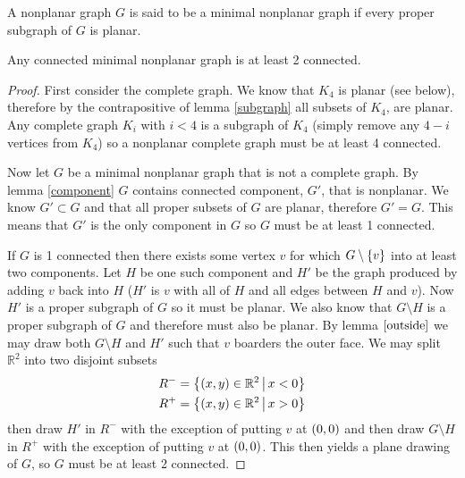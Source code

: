\documentclass{article}
\begin{document}
\begin{definition}
	A nonplanar graph $G$ is said to be a minimal nonplanar graph if every proper subgraph of $G$ is planar.
\end{definition}


\begin{lemma}\label{2connect}
	Any connected minimal nonplanar graph is at least 2 connected.
\end{lemma}

\begin{proof}
	First consider the complete graph. We know that $K_4$ is planar (see below), therefore by the contrapositive of lemma \ref{subgraph} all subsets of $K_4$, are planar. Any complete graph $K_i$ with $i < 4$ is a subgraph of $K_4$ (simply remove any $4-i$ vertices from $K_4$) so a nonplanar complete graph must be at least 4 connected.
	
	\begin{center}
	\end{center}
	
	
	Now let $G$ be a minimal nonplanar graph that is not a complete graph. By lemma \ref{component} $G$ contains connected component, $G'$, that is nonplanar. We know $G'\subset G$ and that all proper subsets of $G$ are planar, therefore $G'=G$. This means that $G'$ is the only component in $G$ so $G$ must be at least 1 connected.
	
	If $G$ is 1 connected then there exists some vertex $v$ for which $G\setminus\left\{ {v} \right\}$ into at least two components. Let $H$ be one such component and $H'$ be the graph produced by adding $v$ back into $H$ ($H'$ is $v$ with all of $H$ and all edges between $H$ and $v$). Now $H'$ is a proper subgraph of $G$ so it must be planar. We also know that $G\setminus H$ is a proper subgraph of $G$ and therefore must also be planar. By lemma $\ref{outside}$ we may draw both $G\setminus H$ and $H'$ such that $v$ boarders the outer face. We may split $\mathbb R^2$ into two disjoint subsets
	\begin{align*}
	R^- &= \left\{{\left( {x} , {y} \right)\in\mathbb R^2} \,\middle|\, {x < 0}\right\}\\
	R^+&=\left\{{\left( {x} , {y} \right)\in\mathbb R^2} \,\middle|\, {x > 0}\right\}
	\end{align*}	
	then draw $H'$ in $R^-$ with the exception of putting $v$ at $\left( {0} , {0} \right)$ and then draw $G\setminus H$ in $R^+$ with the exception of putting $v$ at $\left( {0} , {0} \right)$. This then yields a plane drawing of $G$, so $G$ must be at least 2 connected.
\end{proof}
\end{document}
